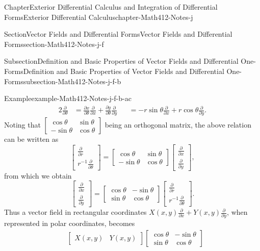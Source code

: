 \documentclass[oneside,10pt,]{book}
\numberwithin{equation}{section}
\newcommand{\amp}{&}
\begin{document}
\begin{chapterptx}{Chapter}{Exterior Differential Calculus and Integration of Differential Forms}{}{Exterior Differential Calculus}{}{}{chapter-Math412-Notes-j}
\begin{sectionptx}{Section}{Vector Fields and Differential Forms}{}{Vector Fields and Differential Forms}{}{}{section-Math412-Notes-j-f}
\begin{subsectionptx}{Subsection}{Definition and Basic Properties of Vector Fields and Differential One-Forms}{}{Definition and Basic Properties of Vector Fields and Differential One-Forms}{}{}{subsection-Math412-Notes-j-f-b}
\begin{example}{Example}{}{example-Math412-Notes-j-f-b-ac}
\begin{alignat*}{2}
\frac{\partial }{\partial \theta} \amp= \frac{\partial x}{\partial \theta} \frac{\partial }{\partial x} +
\frac{\partial y}{\partial \theta} \frac{\partial }{\partial y} \amp\amp
= -r \sin \theta \frac{\partial }{\partial x} + r \cos \theta \frac{\partial }{\partial y}.
\end{alignat*}
Noting that \(\begin{bmatrix} \cos \theta \amp \sin \theta \\ -\sin \theta \amp \cos \theta
\end{bmatrix}\) being an orthogonal matrix, the above relation can be written as%
\begin{equation*}
\begin{bmatrix} \frac{\partial }{\partial r} \\ r^{-1} \frac{\partial }{\partial \theta} \end{bmatrix}
= \begin{bmatrix} \cos \theta \amp \sin \theta \\ -\sin \theta \amp \cos \theta
\end{bmatrix} \begin{bmatrix} \frac{\partial }{\partial x} \\ \frac{\partial }{\partial y} \end{bmatrix},
\end{equation*}
from which we obtain%
\begin{equation*}
\begin{bmatrix} \frac{\partial }{\partial x} \\ \frac{\partial }{\partial y} \end{bmatrix}
= \begin{bmatrix} \cos \theta \amp -\sin \theta \\ \sin \theta \amp \cos \theta
\end{bmatrix} \begin{bmatrix} \frac{\partial }{\partial r} \\ r^{-1} \frac{\partial }{\partial \theta} \end{bmatrix}.
\end{equation*}
Thus a vector field in rectangular coordinates \(X(x,y) \frac{\partial }{\partial x} + Y(x, y) \frac{\partial }{\partial y}\), when represented in polar coordinates, becomes%
\begin{align*}
\amp \begin{bmatrix} X(x,y) \amp Y(x, y) \end{bmatrix} 
\begin{bmatrix} \cos \theta \amp -\sin \theta \\ \sin \theta \amp \cos \theta

\end{bmatrix}
\end{align*}
\end{example}
\end{subsectionptx}
\end{sectionptx}
\end{chapterptx}
\end{document}

